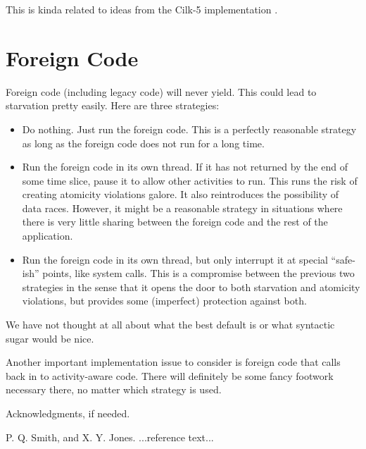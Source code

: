 \documentclass[11pt,preprint]{sigplanconf}
\begin{document}
This is kinda related to ideas from the Cilk-5 implementation
\cite{Frigo1998}.

\section{Foreign Code}

Foreign code (including legacy code) will never yield.  This could lead
to starvation pretty easily.  Here are three strategies:

\begin{itemize}
\item Do nothing.  Just run the foreign code.  This is a perfectly
  reasonable strategy as long as the foreign code does not run for a
  long time.
\item Run the foreign code in its own thread.  If it has not returned by
  the end of some time slice, pause it to allow other activities to run.
  This runs the risk of creating atomicity violations galore.  It also
  reintroduces the possibility of data races.  However, it might be a
  reasonable strategy in situations where there is very little sharing
  between the foreign code and the rest of the application.
\item Run the foreign code in its own thread, but only interrupt it at
  special ``safe-ish'' points, like system calls.  This is a compromise
  between the previous two strategies in the sense that it opens the
  door to both starvation and atomicity violations, but provides some
  (imperfect) protection against both.
\end{itemize}

We have not thought at all about what the best default is or what
syntactic sugar would be nice.

Another important implementation issue to consider is foreign code that
calls back in to activity-aware code.  There will definitely be some
fancy footwork necessary there, no matter which strategy is used.

\acks

Acknowledgments, if needed.





\begin{thebibliography}{}
\softraggedright

P. Q. Smith, and X. Y. Jones. ...reference text...

\end{thebibliography}
\end{document}
